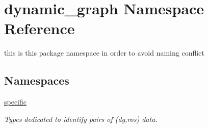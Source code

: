 \hypertarget{namespacedynamic__graph}{}\section{dynamic\+\_\+graph Namespace Reference}
\label{namespacedynamic__graph}


this is this package namespace in order to avoid naming conflict  


\subsection*{Namespaces}
\begin{DoxyCompactItemize}
\item 
 \hyperlink{namespacedynamic__graph_1_1specific}{specific}
\begin{DoxyCompactList}\small\item\em Types dedicated to identify pairs of (dg,ros) data. \end{DoxyCompactList}\end{DoxyCompactItemize}
